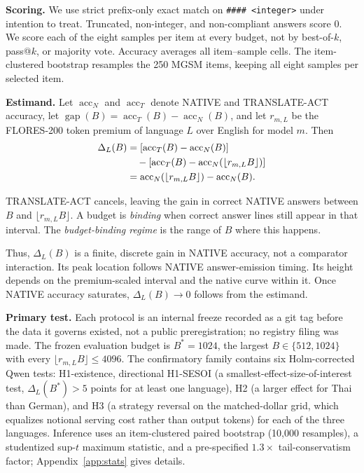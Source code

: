 \documentclass[11pt]{article}
\begin{document}
\textbf{Scoring.} We use strict prefix-only exact match on \texttt{\#\#\#\# <integer>} under intention to treat. Truncated, non-integer, and non-compliant answers score 0. We score each of the eight samples per item at every budget, not by best-of-\(k\), pass@\(k\), or majority vote. Accuracy averages all item--sample cells. The item-clustered bootstrap resamples the 250 MGSM items, keeping all eight samples per selected item.

\textbf{Estimand.} Let \(\operatorname{acc}_N\) and \(\operatorname{acc}_T\) denote NATIVE and TRANSLATE-ACT accuracy, let \(\operatorname{gap}(B)=\operatorname{acc}_T(B)-\operatorname{acc}_N(B)\), and let \(r_{m,L}\) be the FLORES-200 token premium of language \(L\) over English for model \(m\). Then
\begin{align}
\Delta_L(B)
&= [\operatorname{acc}_T(B)-\operatorname{acc}_N(B)] \notag\\
&\quad - [\operatorname{acc}_T(B)
          -\operatorname{acc}_N(\lfloor r_{m,L}B\rfloor)] \notag\\
&= \operatorname{acc}_N(\lfloor r_{m,L}B\rfloor)
   -\operatorname{acc}_N(B).
\end{align}

TRANSLATE-ACT cancels, leaving the gain in correct NATIVE answers between \(B\) and \(\lfloor r_{m,L}B\rfloor\). A budget is \emph{binding} when correct answer lines still appear in that interval. The \emph{budget-binding regime} is the range of \(B\) where this happens.

Thus, \(\Delta_L(B)\) is a finite, discrete gain in NATIVE accuracy, not a comparator interaction. Its peak location follows NATIVE answer-emission timing. Its height depends on the premium-scaled interval and the native curve within it. Once NATIVE accuracy saturates, \(\Delta_L(B)\to0\) follows from the estimand.

\textbf{Primary test.} Each protocol is an internal freeze recorded as a git tag before the data it governs existed, not a public preregistration; no registry filing was made. The frozen evaluation budget is \(B^*=1024\), the largest \(B\in\{512,1024\}\) with every \(\lfloor r_{m,L}B\rfloor\le4096\). The confirmatory family contains six Holm-corrected Qwen tests: H1-existence, directional H1-SESOI (a smallest-effect-size-of-interest test, \(\Delta_L(B^*)>5\) points for at least one language), H2 (a larger effect for Thai than German), and H3 (a strategy reversal on the matched-dollar grid, which equalizes notional serving cost rather than output tokens) for each of the three languages. Inference uses an item-clustered paired bootstrap (10,000 resamples), a studentized sup-\(t\) maximum statistic, and a pre-specified \(1.3\times\) tail-conservatism factor; Appendix~\ref{app:stats} gives details.
\end{document}
